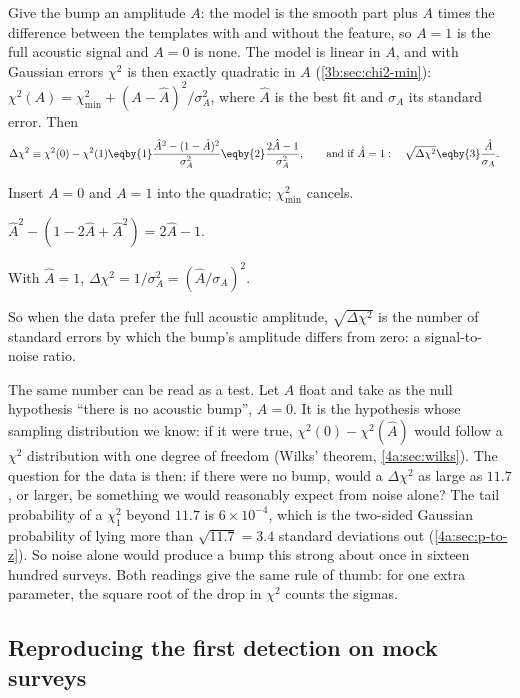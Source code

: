 Give the bump an amplitude $A$: the model is the smooth part plus $A$ times the
difference between the templates with and without the feature, so $A=1$ is the
full acoustic signal and $A=0$ is none. The model is linear in $A$, and with
Gaussian errors $\chi^2$ is then exactly quadratic in $A$ (\cref{3b:sec:chi2-min}):
$\chi^2(A)=\chi^2_{\min}+(A-\hat A)^2/\sigma_A^2$, where $\hat A$ is the best fit
and $\sigma_A$ its standard error. Then
\begin{align}
  \Delta\chi^2\equiv\chi^2(0)-\chi^2(1)
  &\eqby{1}\frac{\hat A^2-(1-\hat A)^2}{\sigma_A^2}
   \eqby{2}\frac{2\hat A-1}{\sigma_A^2},
  \qquad\text{and if }\hat A=1:\quad
  \sqrt{\Delta\chi^2}\eqby{3}\frac{\hat A}{\sigma_A}.
  \label{11a:eq:dchi2-sigma}
\end{align}
\begin{explain}
  \item Insert $A=0$ and $A=1$ into the quadratic; $\chi^2_{\min}$ cancels.
  \item $\hat A^2-(1-2\hat A+\hat A^2)=2\hat A-1$.
  \item With $\hat A=1$, $\Delta\chi^2=1/\sigma_A^2=(\hat A/\sigma_A)^2$.
\end{explain}
So when the data prefer the full acoustic amplitude, $\sqrt{\Delta\chi^2}$ is the
number of standard errors by which the bump's amplitude differs from zero: a
signal-to-noise ratio.

The same number can be read as a test. Let $A$ float and take as the null
hypothesis ``there is no acoustic bump'', $A=0$. It is the hypothesis whose sampling distribution we know:
if it were true, $\chi^2(0)-\chi^2(\hat A)$ would follow a $\chi^2$ distribution
with one degree of freedom (Wilks' theorem, \cref{4a:sec:wilks}). The question
for the data is then: if there were no bump, would a $\Delta\chi^2$ as large as
$11.7$, or larger, be something we would reasonably expect from noise alone? The
tail probability of a $\chi^2_1$ beyond $11.7$ is $6\times10^{-4}$, which is the
two-sided Gaussian probability of lying more than $\sqrt{11.7}=3.4$ standard
deviations out (\cref{4a:sec:p-to-z}). So noise alone would produce a bump this
strong about once in sixteen hundred surveys.
Both readings give the same rule of thumb: for one extra parameter, the square
root of the drop in $\chi^2$ counts the sigmas.

\subsection{Reproducing the first detection on mock surveys}
\label{11a:sec:bao-mocks}

